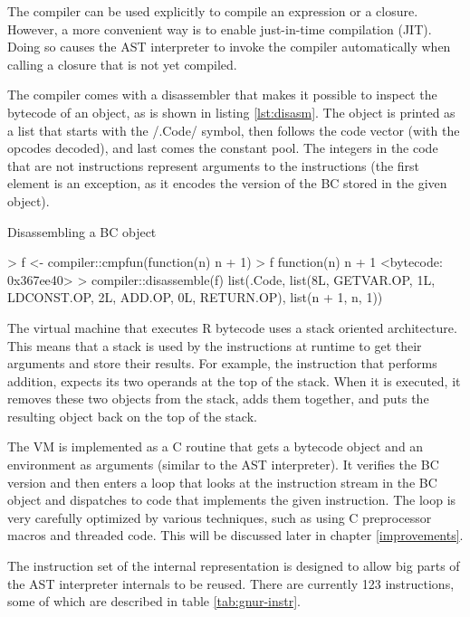 {The compiler can be used explicitly to compile an expression or a closure. However, a more convenient way is to enable just-in-time compilation (JIT). Doing so causes the AST interpreter to invoke the compiler automatically when calling a closure that is not yet compiled.

The compiler comes with a disassembler that makes it possible to inspect the bytecode of an object, as is shown in listing \ref{lst:disasm}. The object is printed as a list that starts with the \rinline/.Code/ symbol, then follows the code vector (with the opcodes decoded), and last comes the constant pool. The integers in the code that are not instructions represent arguments to the instructions (the first element is an exception, as it encodes the version of the BC stored in the given object).

\begin{listing}[htbp]
  \caption{\label{lst:disasm}Disassembling a BC object}
  \begin{rcode}
> f <- compiler::cmpfun(function(n) n + 1)
> f
function(n) n + 1
<bytecode: 0x367ee40>
> compiler::disassemble(f)
list(.Code, list(8L, GETVAR.OP, 1L, LDCONST.OP, 2L, ADD.OP, 0L, 
    RETURN.OP), list(n + 1, n, 1))
  \end{rcode}
\end{listing}

The virtual machine that executes R bytecode uses a stack oriented architecture. This means that a stack is used by the instructions at runtime to get their arguments and store their results. For example, the instruction that performs addition, expects its two operands at the top of the stack. When it is executed, it removes these two objects from the stack, adds them together, and puts the resulting object back on the top of the stack.

The VM is implemented as a C routine that gets a bytecode object and an environment as arguments (similar to the AST interpreter). It verifies the BC version and then enters a loop that looks at the instruction stream in the BC object and dispatches to code that implements the given instruction. The loop is very carefully optimized by various techniques, such as using C preprocessor macros and threaded code. This will be discussed later in chapter \ref{improvements}.

The instruction set of the internal representation is designed to allow big parts of the AST interpreter internals to be reused. There are currently 123 instructions, some of which are described in table \ref{tab:gnur-instr}.

}
